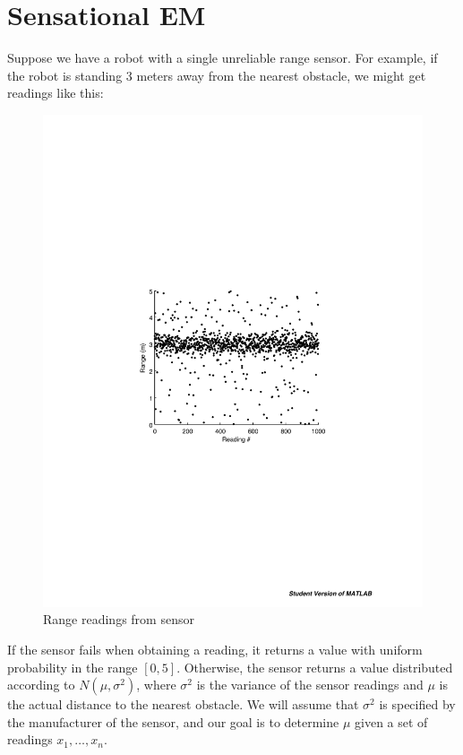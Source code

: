 \section{Sensational EM }

Suppose we have a robot with a single unreliable range sensor. For
example, if the robot is standing 3 meters away from the nearest
obstacle, we might get readings like this:
\begin{figure}[h!]
  \centering
  \includegraphics[scale=0.5]{images/range_readings}
  \caption{Range readings from sensor}\label{fig:range}
\end{figure}

If the sensor fails when obtaining a reading, it returns a value with
uniform probability in the range $[0,5]$. Otherwise, the sensor
returns a value distributed according to $N(\mu, \sigma^2)$, where
$\sigma^2$ is the variance of the sensor readings and $\mu$ is the
actual distance to the nearest obstacle. We will assume that
$\sigma^2$ is specified by the manufacturer of the sensor, and our
goal is to determine $\mu$ given a set of readings $x_1,\dots,x_n$.

